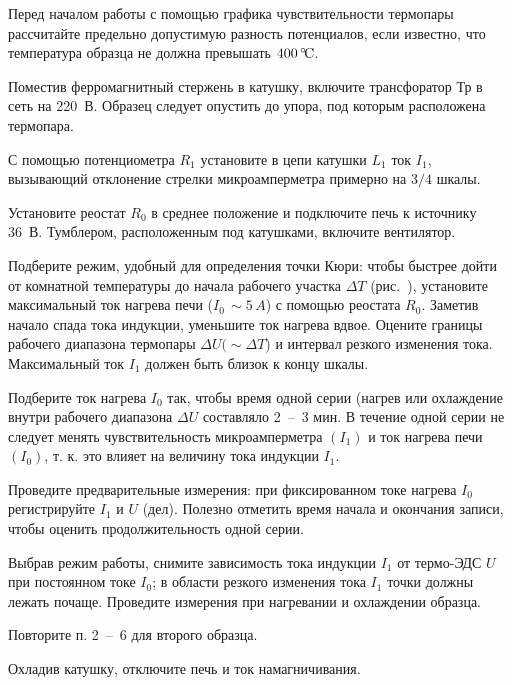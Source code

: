 \begin{lab:task}
    
\item
  \label{item:1}
  Перед началом работы с помощью графика чувствительности термопары рассчитайте
предельно допустимую разность потенциалов, если известно, что температура
образца не должна превышать $400\,^\circ\!\mathrm{C}$.
\item
  Поместив ферромагнитный стержень в катушку, включите трансфоратор $\text{Тр}$
в сеть на 220~В. Образец следует опустить до упора, под которым расположена
термопара.
\item
  С помощью потенциометра $R_1$ установите в цепи катушки $L_1$ ток $I_1$,
вызывающий отклонение стрелки микроамперметра примерно на $3/4$ шкалы.
\item
  Установите реостат $R_0$ в среднее положение и подключите печь к ис­точнику
36~В. Тумблером, расположенным под катушками, включите вентилятор.
\item
  Подберите режим, удобный для определения точки Кюри: чтобы быстрее дойти от
комнатной температуры до начала рабочего участка $\Delta T$
(рис.~), установите максимальный
ток нагрева печи ($I_0\,\sim5\,A$) с помощью реостата $R_0$. Заметив начало
спада тока индукции, уменьшите ток нагрева вдвое. Оцените границы рабочего
диапазона термопары $\Delta U ( \sim\Delta T$) и интервал резкого изменения
тока. Максимальный ток $I_1$ должен быть близок к концу шкалы.


Подберите ток нагрева $I_0$ так, чтобы время одной серии (нагрев или охлаждение
внутри рабочего диапазона $\Delta U$ составляло 2~--~3 мин. В течение одной
серии не следует менять чувствительность микроамперметра $(I_1)$ и ток нагрева
печи $(I_0)$, т. к. это влияет на величину тока индукции $I_1$.

Проведите предварительные измерения: при фиксированном токе нагрева $I_0$
регистрируйте $I_1$ и $U$ (дел). Полезно отметить время начала и окончания
записи, чтобы оценить продолжительность одной серии.

\item
  Выбрав режим работы, снимите зависимость тока индукции $I_1$ от термо-ЭДС $U$
при постоянном токе $I_0$; в
  области резкого изменения тока $I_1$ точки должны лежать почаще. Проведите
измерения при нагревании и охлаждении образца.

\item
  Повторите п. 2~--~6 для второго образца.
\item
  Охладив катушку, отключите печь и ток намагничивания.


\end{lab:task}

